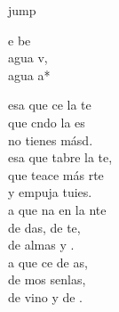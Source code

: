 \begin{cancion}jump\\
	\begin{chorus}%
		e be \\
		 agua v,\\
		 agua a*\jump\\
	\end{chorus}%
	esa que ce la te \\
	que cndo la es \\
	no tienes másd. \\
	esa que tabre la te,  \\
	que teace más rte  \\
	y empuja tuies.\\
	\jump
	a que na en la nte  \\
	de das, de te,  \\
	de almas y . \\
	a que ce de as, \\
	de mos senlas,  \\
	de vino y de . \\
\end{cancion}%
